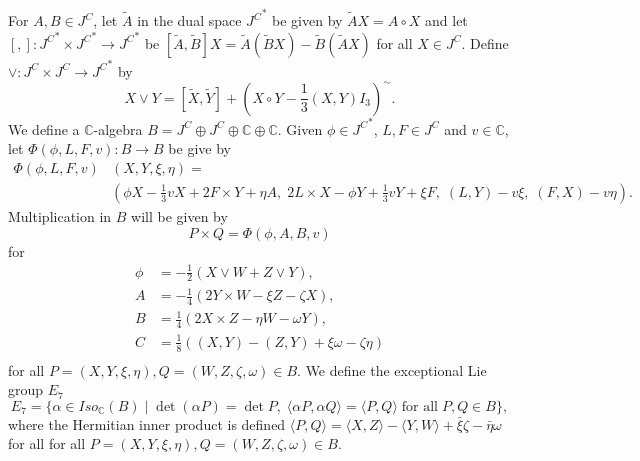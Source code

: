 \documentclass{article}
\theoremstyle{plain}
\theoremstyle{definition}
\numberwithin{thm}{section}
\begin{document}
		For $A,B\in J^C$, let $\tilde{A}$ in the dual space ${J^C}^*$ be given by $\tilde{A}X=A\circ X$ 
		and let $[,]\colon {J^C}^*\times {J^C}^*\to {J^C}^*$ be $[\tilde{A},\tilde{B}]X=\tilde{A}(\tilde{B}X)-\tilde{B}(\tilde{A}X)$ for all $X\in J^C$.
		Define $\vee \colon J^C\times J^C \to {J^C}^*$ by
		\begin{equation*}
			X\vee Y=[\tilde{X}, \tilde{Y}]+(X\circ Y-\frac{1}{3}(X,Y)I_3)^{\sim}.
		\end{equation*}
		We define a $\mathbb{C}$-algebra $B=J^C\oplus J^C \oplus \mathbb{C} \oplus \mathbb{C}$.
		Given $\phi\in {J^C}^*$, $L,F\in J^C$ and $v\in \mathbb{C}$, let $\Phi(\phi,L,F,v)\colon B \to B$ be give by
		\begin{align*}
			\Phi(\phi,L,F,v)&(X,Y,\xi,\eta)=\\
			&(\phi X-\frac{1}{3}vX+2F\times Y+\eta A,\;2L\times X-\phi Y+\frac{1}{3}vY+\xi F,\;(L,Y)-v\xi,\;(F,X)-v\eta).
		\end{align*}
		Multiplication in $B$ will be given by
		\begin{equation*}
			P\times Q=\Phi(\phi,A,B,v)
		\end{equation*}	
		for
		\begin{align*}
			\phi&=-\frac{1}{2}(X\vee W+Z \vee Y),\\
			A&=-\frac{1}{4}(2Y\times W-\xi Z- \zeta X),\\
			B&=\frac{1}{4}(2X\times Z-\eta W-\omega Y),\\
			C&=\frac{1}{8}((X,Y)-(Z,Y)+\xi\omega-\zeta\eta)\\
		\end{align*}
		for all $P=(X,Y,\xi,\eta),Q=(W,Z,\zeta,\omega)\in B$.
		We define the exceptional Lie group $E_7$
		\begin{equation*}
			E_7=\{ \alpha \in Iso_{\mathbb{C}}(B) \; | \; \det(\alpha P)=\det P, \; \langle\alpha P,\alpha Q\rangle =\langle P,Q \rangle \; \text{for all} \; P,Q\in B \},
		\end{equation*}
		where the Hermitian inner product is defined $\langle P,Q \rangle=\langle X,Z \rangle-\langle Y,W \rangle+\bar{\xi}\zeta-\bar{\eta}\omega$
		for all for all $P=(X,Y,\xi,\eta),Q=(W,Z,\zeta,\omega)\in B$.
		
\end{document}

